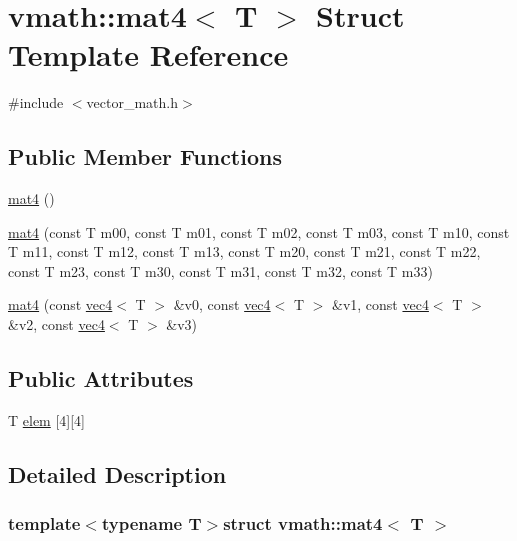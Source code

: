 \hypertarget{structvmath_1_1mat4}{\section{vmath\-:\-:mat4$<$ T $>$ Struct Template Reference}
\label{structvmath_1_1mat4}
}


{\ttfamily \#include $<$vector\-\_\-math.\-h$>$}

\subsection*{Public Member Functions}
\begin{DoxyCompactItemize}
\item 
\hyperlink{structvmath_1_1mat4_acaf5814776f3b24c2881367966276f8e}{mat4} ()
\item 
\hyperlink{structvmath_1_1mat4_aa2dcc9228555e7a672e24459e8a1e9cb}{mat4} (const T m00, const T m01, const T m02, const T m03, const T m10, const T m11, const T m12, const T m13, const T m20, const T m21, const T m22, const T m23, const T m30, const T m31, const T m32, const T m33)
\item 
\hyperlink{structvmath_1_1mat4_a82bbc5b0bb4a4202008a3e9e20417636}{mat4} (const \hyperlink{structvmath_1_1vec4}{vec4}$<$ T $>$ \&v0, const \hyperlink{structvmath_1_1vec4}{vec4}$<$ T $>$ \&v1, const \hyperlink{structvmath_1_1vec4}{vec4}$<$ T $>$ \&v2, const \hyperlink{structvmath_1_1vec4}{vec4}$<$ T $>$ \&v3)
\end{DoxyCompactItemize}
\subsection*{Public Attributes}
\begin{DoxyCompactItemize}
\item 
T \hyperlink{structvmath_1_1mat4_ab788c59d34e579d4b4b1cf88f2b09716}{elem} \mbox{[}4\mbox{]}\mbox{[}4\mbox{]}
\end{DoxyCompactItemize}


\subsection{Detailed Description}
\subsubsection*{template$<$typename T$>$struct vmath\-::mat4$<$ T $>$}




